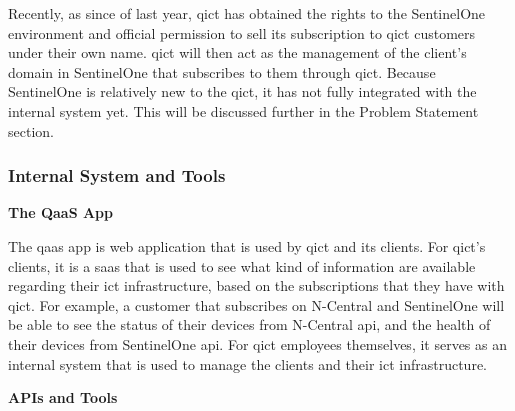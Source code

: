 Recently, as since of last year, \acrshort{qict} has obtained the rights to the SentinelOne environment and official permission to
sell its subscription to \acrshort{qict} customers under their own name. \acrshort{qict} will then act as the management of the client's
domain in SentinelOne that subscribes to them through \acrshort{qict}. Because SentinelOne is relatively new to the \acrshort{qict},
it has not fully integrated with the internal system yet. This will be discussed further in the Problem Statement section.

\subsubsection{Internal System and Tools}

\textbf{The QaaS App}

The \acrshort{qaas} app is web application that is used by \acrshort{qict} and its clients.
For \acrshort{qict}'s clients, it is a \acrshort{saas} that is used to see what kind of information are available
regarding their \acrshort{ict} infrastructure, based on the subscriptions that they have with \acrshort{qict}.
For example, a customer that subscribes on N-Central and SentinelOne will be able to see the status of their
devices from N-Central \acrshort{api}, and the health of their devices from SentinelOne \acrshort{api}.
For \acrshort{qict} employees themselves, it serves as an internal system that is used to manage the clients and their
\acrshort{ict} infrastructure.

\textbf{APIs and Tools}


